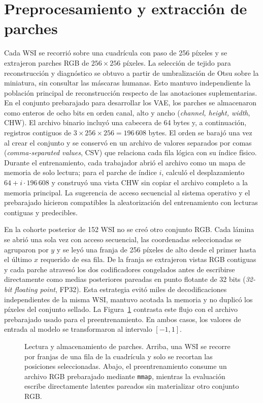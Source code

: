 \section{Preprocesamiento y extracción de parches}

Cada WSI se recorrió sobre una cuadrícula con paso de 256 píxeles y se
extrajeron parches RGB de \(256\times256\) píxeles. La selección de tejido para
reconstrucción y diagnóstico se obtuvo a partir de umbralización de Otsu sobre
la miniatura, sin consultar las máscaras humanas. Esto mantuvo independiente la
población principal de reconstrucción respecto de las anotaciones
suplementarias. En el conjunto prebarajado para desarrollar los VAE, los
parches se almacenaron como enteros de ocho bits en orden canal, alto y ancho (\emph{channel, height, width}, CHW).
El archivo binario incluyó una cabecera de 64 bytes y, a continuación,
registros contiguos de \(3\times256\times256=196\,608\) bytes. El orden se
barajó una vez al crear el conjunto y se conservó en un archivo de valores separados por comas (\emph{comma-separated values}, CSV) que relaciona cada
fila lógica con su índice físico. Durante el entrenamiento, cada trabajador
abrió el archivo como un mapa de memoria de solo lectura; para el parche de
índice \(i\), calculó el desplazamiento
\(64+i\cdot196\,608\) y construyó una vista CHW sin copiar el archivo completo
a la memoria principal. La sugerencia de acceso secuencial al sistema operativo
y el prebarajado hicieron compatibles la aleatorización del entrenamiento con
lecturas contiguas y predecibles.

En la cohorte posterior de 152 WSI no se creó otro conjunto RGB. Cada lámina se
abrió una sola vez con acceso secuencial, las coordenadas seleccionadas se
agruparon por \(y\) y se leyó una franja de 256 píxeles de alto desde el primer
hasta el último \(x\) requerido de esa fila. De la franja se extrajeron vistas
RGB contiguas y cada parche atravesó los dos codificadores congelados antes de
escribirse directamente como medias posteriores pareadas en punto flotante
de 32 bits (\emph{32-bit floating point}, FP32). Esta
estrategia evitó miles de decodificaciones independientes de la misma WSI,
mantuvo acotada la memoria y no duplicó los píxeles del conjunto sellado. La
Figura~\ref{fig:lectura-parches-wsi} contrasta este flujo con el archivo
prebarajado usado para el preentrenamiento. En ambos casos, los valores de
entrada al modelo se transformaron al intervalo \([-1,1]\).

\begin{figure}[htbp]
    \centering
    \resizebox{\textwidth}{!}{}
    \caption{Lectura y almacenamiento de parches. Arriba, una WSI se recorre
    por franjas de una fila de la cuadrícula y solo se recortan las posiciones
    seleccionadas. Abajo, el preentrenamiento consume un archivo RGB
    prebarajado mediante \texttt{mmap}, mientras la evaluación escribe
    directamente latentes pareados sin materializar otro conjunto RGB.}
    \label{fig:lectura-parches-wsi}
\end{figure}

